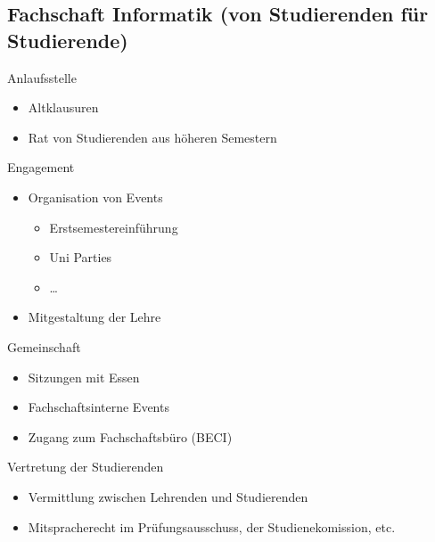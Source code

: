 \documentclass[
	aspectratio=169, 
	10pt 
]{beamer}
\begin{document}
\subsection{Fachschaft Informatik (von Studierenden für Studierende)}
\begin{frame}{\insertsubsection}
    \begin{fancycolumns}[columns=2]
        \begin{definition}{Anlaufsstelle}
            \begin{itemize}
                \item Altklausuren
                \item Rat von Studierenden aus höheren Semestern
            \end{itemize}
        \end{definition}
        
        \begin{definition}{Engagement}
            \begin{itemize}
                \item Organisation von Events \begin{itemize}
                    \item Erstsemestereinführung
                    \item Uni Parties 
                    \item \dots
                \end{itemize}
                \item Mitgestaltung der Lehre
            \end{itemize}
        \end{definition}
        
        \nextcolumn
        \begin{definition}{Gemeinschaft}
            \begin{itemize}
                \item Sitzungen mit Essen
                \item Fachschaftsinterne Events 
                \item Zugang zum Fachschaftsbüro (BECI)
            \end{itemize}
        \end{definition}

        \begin{definition}{Vertretung der Studierenden}
            \begin{itemize}
                \item Vermittlung zwischen Lehrenden und Studierenden 
                \item Mitspracherecht im Prüfungsausschuss, der Studienekomission, etc.
            \end{itemize}
        \end{definition}

    \end{fancycolumns}
\end{frame}
\end{document}

